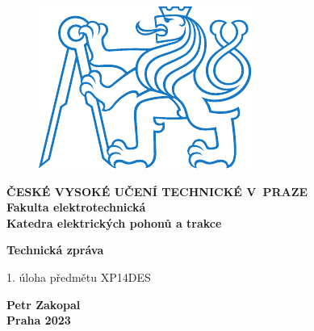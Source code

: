 \documentclass[a4paper, twoside, 11pt]{article}
\begin{document}
\setcounter{figure}{0}

\begin{titlepage}
	\begin{center}

\begin{figure}[H]
	\begin{center}
		\includegraphics[scale=1]{src/misc/symbol_cvut_konturova_verze.pdf}
	\end{center}
\end{figure}
	{\Large{\textbf{ČESKÉ VYSOKÉ UČENÍ TECHNICKÉ V~PRAZE}}}\\
	{\textbf{Fakulta elektrotechnická}}\\
	{\textbf{Katedra elektrických pohonů a trakce}}
	
	\vspace{3cm}
	
	
	{\Large\textbf{Technická zpráva}}
	
	\vspace{1cm}
	
	
	
	1. úloha předmětu XP14DES\\
	
	\end{center}
	
	\vspace{3cm}
	
	
	\vspace{0.5cm}
	
	\vfill
	
\begin{center}

	\large{\textbf{Petr Zakopal}}\\
	\large{\textbf{Praha 2023}}
	\end{center}
\end{titlepage}
\end{document}
